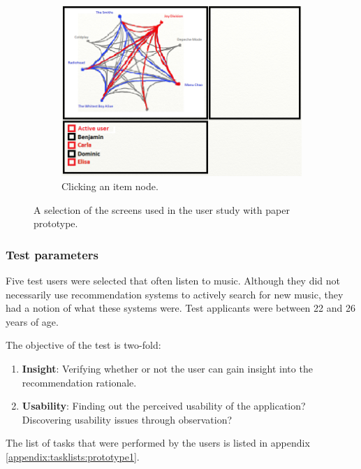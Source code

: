 \begin{figure}
\begin{subfigure}[b]{0.3\textwidth}
					\centering
					\includegraphics[width=\textwidth]{img/paper_prototype_item_click}
					\caption{Clicking an item node.}
					\label{figure:paper_prototype_item_click}
	\end{subfigure}
	\caption{A selection of the screens used in the user study with paper prototype.}%
	\label{figure:paper_prototype}%
\end{figure}


\subsubsection{Test parameters}\label{chapter:prototype:section:paper:setup}

Five test users were selected that often listen to music. Although they did not necessarily use recommendation systems to actively search for new music, they had a notion of what these systems were. Test applicants were between 22 and 26 years of age.

The objective of the test is two-fold:

\begin{enumerate}
	\item \textbf{Insight}: Verifying whether or not the user can gain insight into the recommendation rationale.
	\item \textbf{Usability}: Finding out the perceived usability of the application? Discovering usability issues through observation?
\end{enumerate}

The list of tasks that were performed by the users is listed in appendix \ref{appendix:tasklists:prototype1}.


